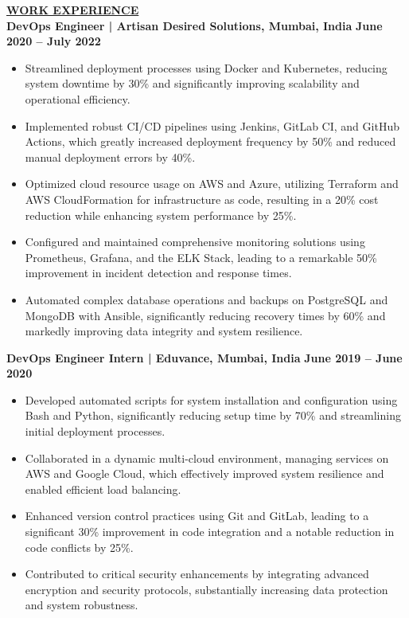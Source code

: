 \documentclass{article}
\begin{document}
\noindent \textbf{\underline{WORK EXPERIENCE}} \\
\noindent \textbf{DevOps Engineer | Artisan Desired Solutions, Mumbai, India}  \hfill \textbf{June 2020 – July 2022}
\begin{itemize}[noitemsep,nolistsep,leftmargin=*]
\item {\small Streamlined deployment processes using Docker and Kubernetes, reducing system downtime by 30\% and significantly improving scalability and operational efficiency.}
\item {\small Implemented robust CI/CD pipelines using Jenkins, GitLab CI, and GitHub Actions, which greatly increased deployment frequency by 50\% and reduced manual deployment errors by 40\%.}
\item {\small Optimized cloud resource usage on AWS and Azure, utilizing Terraform and AWS CloudFormation for infrastructure as code, resulting in a 20\% cost reduction while enhancing system performance by 25\%.}
\item {\small Configured and maintained comprehensive monitoring solutions using Prometheus, Grafana, and the ELK Stack, leading to a remarkable 50\% improvement in incident detection and response times.}
\item {\small Automated complex database operations and backups on PostgreSQL and MongoDB with Ansible, significantly reducing recovery times by 60\% and markedly improving data integrity and system resilience.}
\end{itemize}
\vspace{1mm}

\noindent \textbf{DevOps Engineer Intern | Eduvance, Mumbai, India}  \hfill \textbf{June 2019 – June 2020}
\begin{itemize}[noitemsep,nolistsep,leftmargin=*]
\item {\small Developed automated scripts for system installation and configuration using Bash and Python, significantly reducing setup time by 70\% and streamlining initial deployment processes.}
\item {\small Collaborated in a dynamic multi-cloud environment, managing services on AWS and Google Cloud, which effectively improved system resilience and enabled efficient load balancing.}
\item {\small Enhanced version control practices using Git and GitLab, leading to a significant 30\% improvement in code integration and a notable reduction in code conflicts by 25\%.}
\item {\small Contributed to critical security enhancements by integrating advanced encryption and security protocols, substantially increasing data protection and system robustness.}
\end{itemize}
\end{document}
